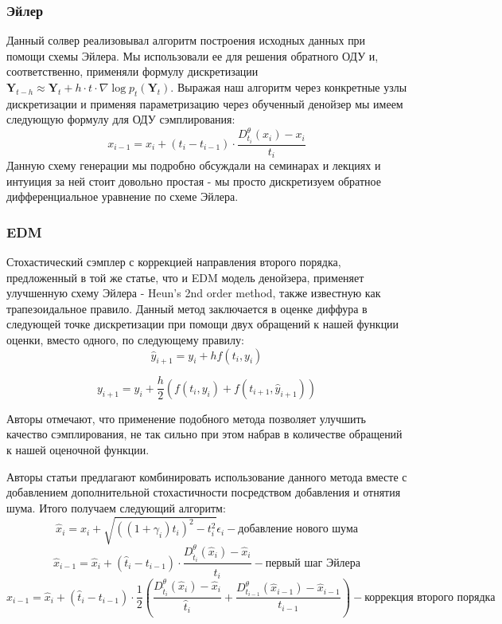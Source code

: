 \documentclass[a4paper]{article}
\begin{document}
    \subsubsection{Эйлер}
    Данный солвер реализовывал алгоритм построения исходных данных при помощи схемы Эйлера. Мы использовали ее для решения обратного ОДУ и, соответственно, применяли формулу дискретизации $\mathbf{Y}_{t - h} \approx  \mathbf{Y}_t + h \cdot t \cdot \nabla \log p_t(\mathbf{Y}_t)$. Выражая наш алгоритм через конкретные узлы дискретизации и применяя параметризацию через обученный денойзер мы имеем следующую формулу для ОДУ сэмплирования: 
    $$x_{i - 1} = x_{i} + (t_{i} - {t_{i-1}}) \cdot \frac{D^{\theta}_{t_{i}}(x_{i}) - x_{i}}{t_{i}}$$
    Данную схему генерации мы подробно обсуждали на семинарах и лекциях и интуиция за ней стоит довольно простая - мы просто дискретизуем обратное дифференциальное уравнение по схеме Эйлера.

    \subsubsection{EDM}

    Стохастический сэмплер с коррекцией направления второго порядка, предложенный в той же статье, что и EDM модель денойзера, применяет улучшенную схему Эйлера - Heun's 2nd order method, также известную как трапезоидальное правило. Данный метод заключается в оценке диффура в следующей точке дискретизации при помощи двух обращений к нашей функции оценки, вместо одного, по следующему правилу: 
    $$\hat{y}_{i + 1} = y_i + hf(t_i, y_i)$$

    $$y_{i+1} = y_{i} + \frac{h}{2}(f(t_i, y_i) + f(t_{i+1}, \hat{y}_{i + 1}))$$

    Авторы отмечают, что применение подобного метода позволяет улучшить качество сэмплирования, не так сильно при этом набрав в количестве обращений к нашей оценочной функции.

    Авторы статьи предлагают комбинировать использование данного метода вместе с добавлением дополнительной стохастичности посредством добавления и отнятия шума. Итого получаем следующий алгоритм:
    $$\hat{x}_i = x_i + \sqrt{((1 + \gamma_i)t_{i})^2 - t_i^2} \epsilon_i - \text{добавление нового шума}$$
    $$\hat{x}_{i - 1} = \hat{x}_{i} + (\hat{t}_{i} - {t_{i-1}}) \cdot \frac{D^{\theta}_{\hat{t}_{i}}(\hat{x}_{i}) - \hat{x}_{i}}{\hat{t}_{i}} - \text{первый шаг Эйлера}$$
    $$x_{i - 1} = \hat{x}_{i} + (\hat{t}_{i} - {t_{i-1}}) \cdot \frac12 (\frac{D^{\theta}_{\hat{t}_{i}}(\hat{x}_{i}) - \hat{x}_{i}}{\hat{t}_{i}} + \frac{D^{\theta}_{t_{i-1}}(\hat{x}_{i-1}) - \hat{x}_{i-1}}{t_{i-1}}) - \text{коррекция второго порядка}$$
\end{document}
